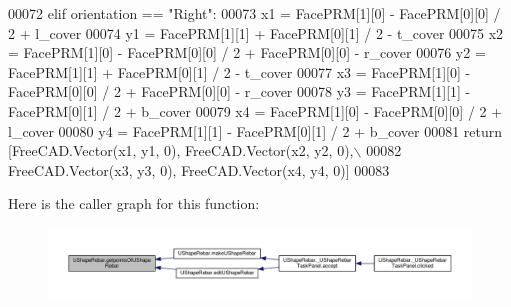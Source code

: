 \begin{DoxyCode}
00072     \textcolor{keywordflow}{elif} orientation == \textcolor{stringliteral}{"Right"}:
00073         x1 = FacePRM[1][0] - FacePRM[0][0] / 2 + l\_cover
00074         y1 = FacePRM[1][1] + FacePRM[0][1] / 2 - t\_cover
00075         x2 = FacePRM[1][0] - FacePRM[0][0] / 2 + FacePRM[0][0] - r\_cover
00076         y2 = FacePRM[1][1] + FacePRM[0][1] / 2 - t\_cover
00077         x3 = FacePRM[1][0] - FacePRM[0][0] / 2 + FacePRM[0][0] - r\_cover
00078         y3 = FacePRM[1][1] - FacePRM[0][1] / 2 + b\_cover
00079         x4 = FacePRM[1][0] - FacePRM[0][0] / 2 + l\_cover
00080         y4 = FacePRM[1][1] - FacePRM[0][1] / 2 + b\_cover
00081     \textcolor{keywordflow}{return} [FreeCAD.Vector(x1, y1, 0), FreeCAD.Vector(x2, y2, 0),\(\backslash\)
00082            FreeCAD.Vector(x3, y3, 0), FreeCAD.Vector(x4, y4, 0)]
00083 
\end{DoxyCode}


Here is the caller graph for this function\+:\nopagebreak
\begin{figure}[H]
\begin{center}
\leavevmode
\includegraphics[width=350pt]{namespaceUShapeRebar_ac12ae9bce6b5211759f2fff4091b0221_icgraph}
\end{center}
\end{figure}


